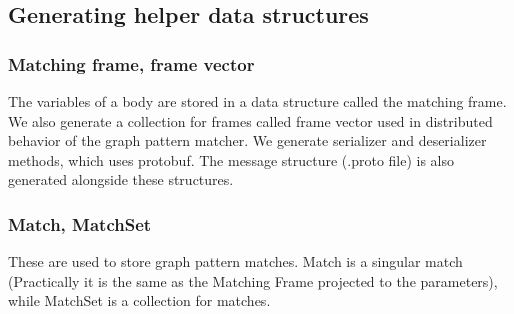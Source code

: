 

\subsection{Generating helper data structures}

\subsubsection{Matching frame, frame vector}

The variables of a body are stored in a data structure called the matching frame.
We also generate a collection for frames called frame vector used in distributed behavior of the graph pattern matcher.
We generate serializer and deserializer methods, which uses protobuf.
The message structure (.proto file) is also generated alongside these structures.

\subsubsection{Match, MatchSet}

These are used to store graph pattern matches. Match is a singular match (Practically it is the same as the Matching Frame projected to the parameters), while MatchSet is a collection for matches.













